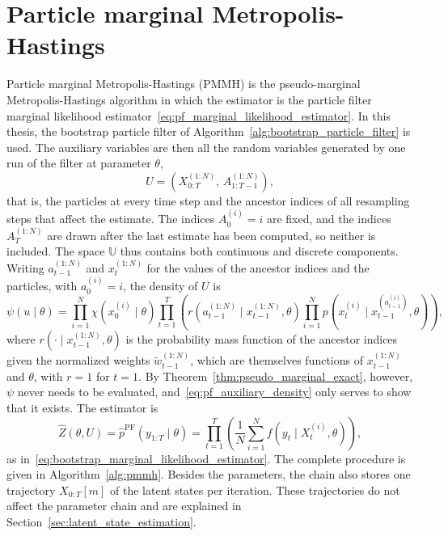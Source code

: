 \section{Particle marginal Metropolis-Hastings}
\label{sec:pmmh}
Particle marginal Metropolis-Hastings (PMMH) \cite{andrieu2010particle} is the pseudo-marginal Metropolis-Hastings algorithm in which the estimator is the particle filter marginal likelihood estimator~\eqref{eq:pf_marginal_likelihood_estimator}. 
In this thesis, the bootstrap particle filter of Algorithm~\ref{alg:bootstrap_particle_filter} is used. The auxiliary variables are then all the random variables generated by one run of the filter at parameter $\theta$,
\begin{equation}
    U = \left(X_{0:T}^{(1:N)},\,A_{1:T-1}^{(1:N)}\right),
\end{equation}
that is, the particles at every time step and the ancestor indices of all resampling steps that affect the estimate. The indices $A_0^{(i)} = i$ are fixed, and the indices $A_T^{(1:N)}$ are drawn after the last estimate has been computed, so neither is included. 
The space $\mathbb{U}$ thus contains both continuous and discrete components. Writing $a_{t-1}^{(1:N)}$ and $x_t^{(1:N)}$ for the values of the ancestor indices and the particles, with $a_0^{(i)} = i$, the density of $U$ is
\begin{equation}
    \psi(u\mid\theta) = \prod_{i=1}^{N}\chi(x_0^{(i)}\mid\theta)\prod_{t=1}^{T}\left(r\left(a_{t-1}^{(1:N)}\mid x_{t-1}^{(1:N)},\theta\right)\prod_{i=1}^{N} p\left(x_t^{(i)}\mid x_{t-1}^{(a_{t-1}^{(i)})},\theta\right)\right),
    \label{eq:pf_auxiliary_density}
\end{equation}
where $r(\cdot\mid x_{t-1}^{(1:N)},\theta)$ is the probability mass function of the ancestor indices given the normalized weights $\tilde{w}_{t-1}^{(1:N)}$, which are themselves functions of $x_{t-1}^{(1:N)}$ and $\theta$, with $r = 1$ for $t=1$. 
By Theorem~\ref{thm:pseudo_marginal_exact}, however, $\psi$ never needs to be evaluated, and~\eqref{eq:pf_auxiliary_density} only serves to show that it exists. The estimator is
\begin{equation}
    \hat{Z}(\theta,U) = \hat{p}^{\mathrm{PF}}(y_{1:T}\mid\theta) = \prod_{t=1}^{T}\left(\frac{1}{N}\sum_{i=1}^{N} f(y_t\mid X_t^{(i)},\theta)\right),
\end{equation}
as in~\eqref{eq:bootstrap_marginal_likelihood_estimator}. The complete procedure is given in Algorithm~\ref{alg:pmmh}. Besides the parameters, the chain also stores one trajectory $X_{0:T}[m]$ of the latent states per iteration. These trajectories do not affect the parameter chain and are explained in Section~\ref{sec:latent_state_estimation}.

